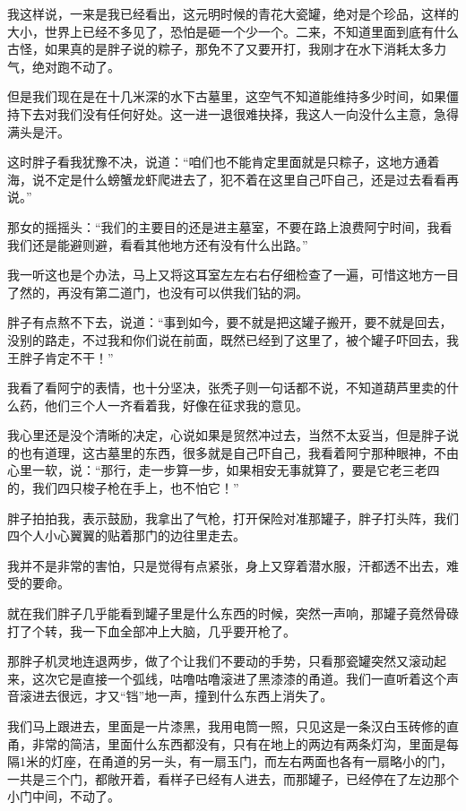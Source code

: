 我这样说，一来是我已经看出，这元明时候的青花大瓷罐，绝对是个珍品，这样的大小，世界上已经不多见了，恐怕是砸一个少一个。二来，不知道里面到底有什么古怪，如果真的是胖子说的粽子，那免不了又要开打，我刚才在水下消耗太多力气，绝对跑不动了。

但是我们现在是在十几米深的水下古墓里，这空气不知道能维持多少时间，如果僵持下去对我们没有任何好处。这一进一退很难抉择，我这人一向没什么主意，急得满头是汗。

这时胖子看我犹豫不决，说道：“咱们也不能肯定里面就是只粽子，这地方通着海，说不定是什么螃蟹龙虾爬进去了，犯不着在这里自己吓自己，还是过去看看再说。”

那女的摇摇头：“我们的主要目的还是进主墓室，不要在路上浪费阿宁时间，我看我们还是能避则避，看看其他地方还有没有什么出路。”

我一听这也是个办法，马上又将这耳室左左右右仔细检查了一遍，可惜这地方一目了然的，再没有第二道门，也没有可以供我们钻的洞。

胖子有点熬不下去，说道：“事到如今，要不就是把这罐子搬开，要不就是回去，没别的路走，不过我和你们说在前面，既然已经到了这里了，被个罐子吓回去，我王胖子肯定不干！”

我看了看阿宁的表情，也十分坚决，张秃子则一句话都不说，不知道葫芦里卖的什么药，他们三个人一齐看着我，好像在征求我的意见。

我心里还是没个清晰的决定，心说如果是贸然冲过去，当然不太妥当，但是胖子说的也有道理，这古墓里的东西，很多就是自己吓自己，我看着阿宁那种眼神，不由心里一软，说：“那行，走一步算一步，如果相安无事就算了，要是它老三老四的，我们四只梭子枪在手上，也不怕它！”

胖子拍拍我，表示鼓励，我拿出了气枪，打开保险对准那罐子，胖子打头阵，我们四个人小心翼翼的贴着那门的边往里走去。

我并不是非常的害怕，只是觉得有点紧张，身上又穿着潜水服，汗都透不出去，难受的要命。

就在我们胖子几乎能看到罐子里是什么东西的时候，突然一声响，那罐子竟然骨碌打了个转，我一下血全部冲上大脑，几乎要开枪了。

那胖子机灵地连退两步，做了个让我们不要动的手势，只看那瓷罐突然又滚动起来，这次它是直接一个弧线，咕噜咕噜滚进了黑漆漆的甬道。我们一直听着这个声音滚进去很远，才又“铛”地一声，撞到什么东西上消失了。

我们马上跟进去，里面是一片漆黑，我用电筒一照，只见这是一条汉白玉砖修的直甬，非常的简洁，里面什么东西都没有，只有在地上的两边有两条灯沟，里面是每隔1米的灯座，在甬道的另一头，有一扇玉门，而左右两面也各有一扇略小的门，一共是三个门，都敞开着，看样子已经有人进去，而那罐子，已经停在了左边那个小门中间，不动了。

